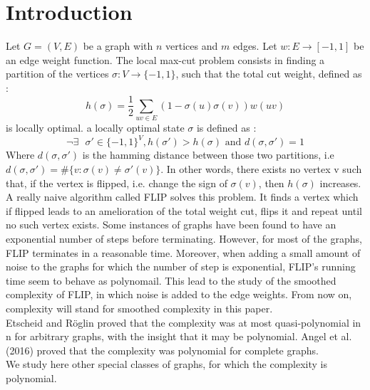 \section{Introduction}

Let $G = (V,E)$ be a graph with $n$ vertices and $m$ edges.  Let $w : E \rightarrow [-1, 1]$ be an edge weight function. The local max-cut problem consists in finding a partition of the vertices $\sigma : V \rightarrow \{-1,1\}$, such that the total cut weight, defined as :
\begin{equation*}
h(\sigma) = \dfrac{1}{2}\sum_{uv \in E}(1 - \sigma(u)\sigma(v))w(uv)
\end{equation*}
is locally optimal. a locally optimal state $\sigma$ is defined as :
\begin{equation*}
\neg \exists \text{  }\sigma' \in \{-1, 1\}^V,  h(\sigma') > h(\sigma) \text{ and } d(\sigma, \sigma') = 1
\end{equation*}
Where $d(\sigma, \sigma')$ is the hamming distance between those two partitions, i.e $d(\sigma, \sigma') = \#\{v : \sigma(v) \neq \sigma'(v)\}$. In other words, there exists no vertex v such that, if the vertex is flipped, i.e. change the sign of $\sigma(v)$, then $h(\sigma)$ increases.\\ 

A really naive algorithm called FLIP solves this problem. It finds a vertex which if flipped leads to an amelioration of the total weight cut, flips it and repeat until no such vertex exists. Some instances of graphs have been found to have an exponential number of steps before terminating. However, for most of the graphs, FLIP terminates in a reasonable time. Moreover, when adding a small amount of noise to the graphs for which the number of step is exponential, FLIP's running time seem to behave as polynomail. This lead to the study of the smoothed complexity of FLIP, in which noise is added to the edge weights. From now on, complexity will stand for smoothed complexity in this paper. \\

Etscheid and Röglin \cite{etscheid2017smoothed} proved that the complexity was at most quasi-polynomial in n for arbitrary graphs, with the insight that it may be polynomial. Angel et al. (2016) \cite{angel2016local} proved that the complexity was polynomial for complete graphs. \\
We study here other special classes of graphs, for which the complexity is polynomial.